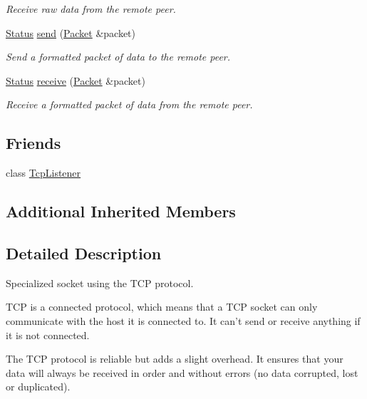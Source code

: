 \begin{DoxyCompactItemize}
\begin{DoxyCompactList}\small\item\em Receive raw data from the remote peer. \end{DoxyCompactList}\item 
\hyperlink{classsf_1_1_socket_a51bf0fd51057b98a10fbb866246176dc}{Status} \hyperlink{classsf_1_1_tcp_socket_a0f8276e2b1c75aac4a7b0a707b250f44}{send} (\hyperlink{classsf_1_1_packet}{Packet} \&packet)
\begin{DoxyCompactList}\small\item\em Send a formatted packet of data to the remote peer. \end{DoxyCompactList}\item 
\hyperlink{classsf_1_1_socket_a51bf0fd51057b98a10fbb866246176dc}{Status} \hyperlink{classsf_1_1_tcp_socket_aa655352609bc9804f2baa020df3e7331}{receive} (\hyperlink{classsf_1_1_packet}{Packet} \&packet)
\begin{DoxyCompactList}\small\item\em Receive a formatted packet of data from the remote peer. \end{DoxyCompactList}\end{DoxyCompactItemize}
\subsection*{Friends}
\begin{DoxyCompactItemize}
\item 
class \hyperlink{classsf_1_1_tcp_socket_a0a6bae466f66732c4d05d5335d705d64}{Tcp\-Listener}
\end{DoxyCompactItemize}
\subsection*{Additional Inherited Members}


\subsection{Detailed Description}
Specialized socket using the T\-C\-P protocol. 

T\-C\-P is a connected protocol, which means that a T\-C\-P socket can only communicate with the host it is connected to. It can't send or receive anything if it is not connected.

The T\-C\-P protocol is reliable but adds a slight overhead. It ensures that your data will always be received in order and without errors (no data corrupted, lost or duplicated).

